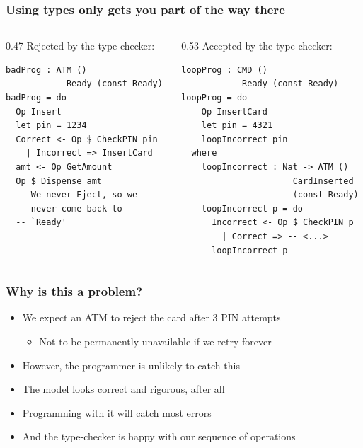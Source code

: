 \documentclass[compress,handout]{beamer}
\begin{document}
\begin{frame}[fragile]
  \frametitle{Using types only gets you part of the way there}

  \begin{columns}
  \begin{column}{0.47\framewidth}
    {\color{red} Rejected by the type-checker:}
    \vspace*{1mm}
    \begin{verbatim}
badProg : ATM ()
            Ready (const Ready)
badProg = do
  Op Insert
  let pin = 1234
  Correct <- Op $ CheckPIN pin
    | Incorrect => InsertCard
  amt <- Op GetAmount
  Op $ Dispense amt 
  -- We never Eject, so we
  -- never come back to
  -- `Ready'
    \end{verbatim}
    \vspace*{2.5mm}
  \end{column}

  \pause  %

  \hspace*{-0.6mm}
  \vrule{}

  \begin{column}{0.53\framewidth}
    {\color{orange} Accepted by the type-checker:}
    \vspace*{1mm}
    \begin{verbatim}
loopProg : CMD ()
            Ready (const Ready)
loopProg = do
    Op InsertCard
    let pin = 4321
    loopIncorrect pin
  where
    loopIncorrect : Nat -> ATM ()
                      CardInserted
                      (const Ready)
    loopIncorrect p = do
      Incorrect <- Op $ CheckPIN p
        | Correct => -- <...>
      loopIncorrect p
    \end{verbatim}
    \vspace*{-6mm}
  \end{column}
  \end{columns}
\end{frame}


\begin{frame}
  \frametitle{Why is this a problem?}

  \begin{itemize}
    \item<1-> We expect an ATM to reject the card after 3 PIN attempts
    \begin{itemize}
      \item<1-> Not to be permanently unavailable if we retry forever
    \end{itemize}
    \item<2-> However, the programmer is unlikely to catch this
    \item<3-> The model looks correct and rigorous, after all
    \item<4-> Programming with it will catch most errors
    \item<5-> And the type-checker is happy with our sequence of operations
  \end{itemize}
\end{frame}
\end{document}
